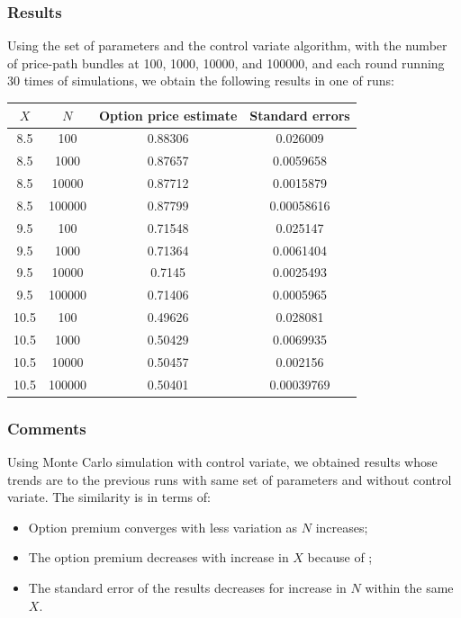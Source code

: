\subsubsection{Results}
Using the set of parameters and the control variate algorithm, with the number of price-path bundles at 100, 1000, 10000, and 100000, and each round running 30 times of simulations, we obtain the following results in one of runs:

\begin{center}
	\begin{tabular}{| c | c | c | c |}
		\hline $X$ & $N$ & Option price estimate & Standard errors\\
		[0.5ex]
		\hline 8.5 & 100 & 0.88306 & 0.026009\\
		\hline 8.5 & 1000 & 0.87657 & 0.0059658\\
		\hline 8.5 & 10000 & 0.87712 & 0.0015879\\
		\hline 8.5 & 100000 & 0.87799 & 0.00058616\\
		\hline
		\hline 9.5 & 100 & 0.71548 & 0.025147\\
		\hline 9.5 & 1000 & 0.71364 & 0.0061404\\
		\hline 9.5 & 10000 & 0.7145 & 0.0025493\\
		\hline 9.5 & 100000 & 0.71406 & 0.0005965\\
		\hline
		\hline 10.5 & 100 & 0.49626 & 0.028081\\
		\hline 10.5 & 1000 & 0.50429 & 0.0069935\\
		\hline 10.5 & 10000 & 0.50457 & 0.002156\\
		\hline 10.5 & 100000 & 0.50401 & 0.00039769\\
		\hline
	\end{tabular}
\end{center}

\subsubsection{Comments}
Using Monte Carlo simulation with control variate, we obtained results whose trends are to the previous runs with same set of parameters and without control variate. The similarity is in terms of:
\begin{itemize}
	\item Option premium converges with less variation as $N$ increases;
	\item The option premium decreases with increase in $X$ because of ; 
	\item The standard error of the results decreases for increase in $N$ within the same $X$. 
\end{itemize}

